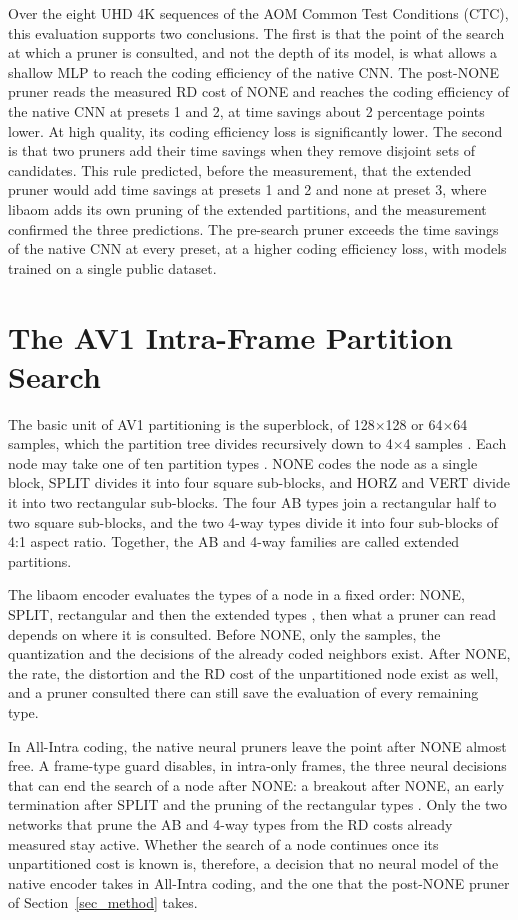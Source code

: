 \documentclass[conference]{IEEEtran}
\begin{document}
Over the eight UHD 4K sequences of the AOM Common Test Conditions (CTC), this
evaluation supports two conclusions. The first is that the point of the search
at which a pruner is consulted, and not the depth of its model, is what allows a
shallow MLP to reach the coding efficiency of the native CNN. The post-NONE
pruner reads the measured RD cost of NONE and reaches the coding efficiency of
the native CNN at presets 1 and 2, at time savings about 2 percentage points
lower. At high quality, its coding efficiency loss is significantly lower. The
second is that two pruners add their time savings when they remove disjoint sets
of candidates. This rule predicted, before the measurement, that the extended
pruner would add time savings at presets 1 and 2 and none at preset 3, where
libaom adds its own pruning of the extended partitions, and the measurement
confirmed the three predictions. The pre-search pruner exceeds the time savings
of the native CNN at every preset, at a higher coding efficiency loss, with
models trained on a single public dataset.

\section{The AV1 Intra-Frame Partition Search}
\label{sec_search}

The basic unit of AV1 partitioning is the superblock, of 128$\times$128 or
64$\times$64 samples, which the partition tree divides recursively down to
4$\times$4 samples \cite{han2021}. Each node may take one of ten partition types
\cite{chen2018}. NONE codes the node as a single block, SPLIT divides it into
four square sub-blocks, and HORZ and VERT divide it into two rectangular
sub-blocks. The four AB types join a rectangular half to two square sub-blocks,
and the two 4-way types divide it into four sub-blocks of 4:1 aspect ratio. Together, the AB and
4-way families are called extended partitions.

The libaom encoder evaluates the types of a node in a fixed order: NONE, SPLIT, 
rectangular and then the extended types \cite{libaom}, then what a pruner can read
depends on where it is consulted. Before NONE, only the samples, the quantization
and the decisions of the already coded neighbors exist. After NONE, the rate, the
distortion and the RD cost of the unpartitioned node exist as well, and a pruner
consulted there can still save the evaluation of every remaining type.

In All-Intra coding, the native neural pruners leave the point after NONE
almost free. A frame-type guard disables, in intra-only frames, the three neural
decisions that can end the search of a node after NONE: a breakout after NONE,
an early termination after SPLIT and the pruning of the rectangular types
\cite{libaom}. Only the two networks that prune the AB and 4-way types from the
RD costs already measured stay active.
Whether the search of a node continues once its unpartitioned cost is
known is, therefore, a decision that no neural model of the native encoder takes
in All-Intra coding, and the one that the post-NONE pruner of
Section~\ref{sec_method} takes.
\end{document}
